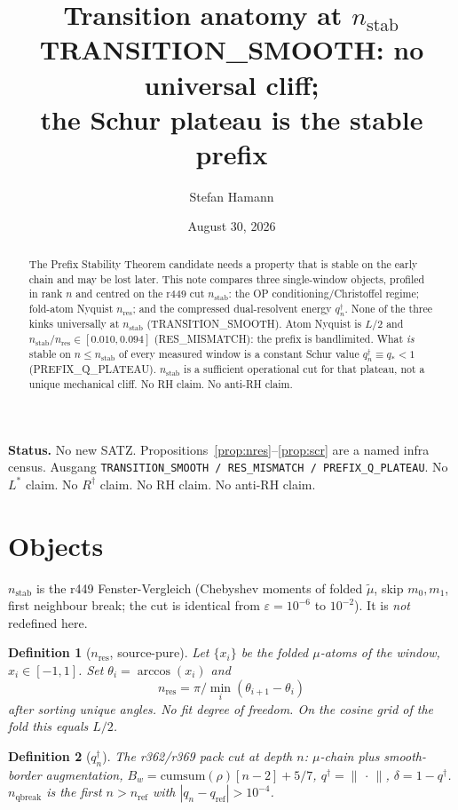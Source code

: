 \documentclass[11pt]{article}
\title{\bfseries Transition anatomy at $n_{\mathrm{stab}}$\\[2mm]
\large TRANSITION\_SMOOTH: no universal cliff;\\
the Schur plateau is the stable prefix}
\author{Stefan Hamann}
\date{August 30, 2026}
\newtheorem{definition}{Definition}
\begin{document}
\maketitle

\begin{abstract}\noindent
The Prefix Stability Theorem candidate needs a
property that is stable on the early chain and
may be lost later.
This note compares three single-window objects,
profiled in rank $n$ and centred on the r449
cut $n_{\mathrm{stab}}$:
the OP conditioning/Christoffel regime;
fold-atom Nyquist $n_{\mathrm{res}}$;
and the compressed dual-resolvent energy
$q^{\dagger}_n$.
None of the three kinks universally at
$n_{\mathrm{stab}}$ (TRANSITION\_SMOOTH).
Atom Nyquist is $L/2$ and
$n_{\mathrm{stab}}/n_{\mathrm{res}}\in[0.010,0.094]$
(RES\_MISMATCH): the prefix is bandlimited.
What \emph{is} stable on $n\le n_{\mathrm{stab}}$
of every measured window is a constant Schur
value $q^{\dagger}_n\equiv q_*<1$
(PREFIX\_Q\_PLATEAU).
$n_{\mathrm{stab}}$ is a sufficient operational
cut for that plateau, not a unique mechanical
cliff.
No RH claim.  No anti-RH claim.
\end{abstract}

\medskip\noindent
\textbf{Status.}\enspace
No new SATZ.
Propositions~\ref{prop:nres}--\ref{prop:scr}
are a named infra census.
Ausgang
\texttt{TRANSITION\_SMOOTH / RES\_MISMATCH / PREFIX\_Q\_PLATEAU}.
No $L^{*}$ claim.  No $R^{\dagger}$ claim.
No RH claim.  No anti-RH claim.

\section{Objects}\label{sec:obj}

$n_{\mathrm{stab}}$ is the r449 Fenster-Vergleich
(Chebyshev moments of folded $\tilde\mu$, skip
$m_0,m_1$, first neighbour break; the cut is
identical from $\varepsilon=10^{-6}$ to
$10^{-2}$).  It is \emph{not} redefined here.

\begin{definition}[$n_{\mathrm{res}}$, source-pure]\label{def:nres}
Let $\{x_i\}$ be the folded $\mu$-atoms of the
window, $x_i\in[-1,1]$.
Set $\theta_i=\arccos(x_i)$ and
\[
n_{\mathrm{res}}
=\pi\big/\min_i(\theta_{i+1}-\theta_i)
\]
after sorting unique angles.
No fit degree of freedom.
On the cosine grid of the fold this equals
$L/2$.
\end{definition}

\begin{definition}[$q^{\dagger}_n$]\label{def:q}
The r362/r369 pack cut at depth $n$:
$\mu$-chain plus smooth-border augmentation,
$B_w=\mathrm{cumsum}(\rho)[n-2]+5/7$,
$q^{\dagger}=\|\,\cdot\,\|$, $\delta=1-q^{\dagger}$.
$n_{\mathrm{qbreak}}$ is the first $n>n_{\mathrm{ref}}$
with $|q_n-q_{\mathrm{ref}}|>10^{-4}$.
\end{definition}
\end{document}
